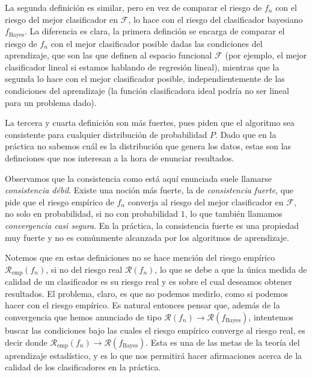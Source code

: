 \documentclass{article}
\begin{document}
La segunda definición es similar, pero en vez de comparar el riesgo de $f_n$ con el riesgo del mejor clasificador en $\mathcal{F}$,
lo hace con el riesgo del clasificador bayesiano $f_{\text{Bayes}}$. La diferencia es clara, la primera definción se encarga de 
comparar el riesgo de $f_n$ con el mejor clasificador posible dadas las condiciones del aprendizaje, que son las que definen al espacio funcional 
$\mathcal{F}$ (por ejemplo, el mejor clasificador lineal si estamos hablando de regresión lineal), mientras que la segunda lo hace con el
mejor clasificador posible, independientemente de las condiciones del aprendizaje (la función clasificadora ideal podría no ser lineal
para un problema dado).\newline

La tercera y cuarta definición son más fuertes, pues piden que el algoritmo sea consistente para cualquier distribución de probabilidad $P$.
Dado que en la práctica no sabemos cuál es la distribución que genera los datos, estas son las definciones que nos interesan a la hora de 
enunciar resultados.\newline

Observamos que la consistencia como está aquí enunciada suele llamarse \textit{consistencia débil}. Existe una noción más fuerte, la de
\textit{consistencia fuerte}, que pide que el riesgo empírico de $f_n$ converja al riesgo del mejor clasificador en $\mathcal{F}$, no solo
en probabilidad, si no con probabilidad $1$, lo que también llamamos \textit{convergencia casi segura}. En la práctica, la consistencia fuerte es una propiedad muy fuerte y no es comúnmente
alcanzada por los algoritmos de aprendizaje.\newline

Notemos que en estas definiciones no se hace mención del riesgo empírico $\mathcal{R}_{\text{emp}}(f_n)$, si no del riesgo real $\mathcal{R}(f_n)$, lo que
se debe a que la única medida de calidad de un clasificador es su riesgo real y es sobre el cual deseamos obtener resultados. El problema, claro,
es que no podemos medirlo, como si podemos hacer con el riesgo empírico. Es natural entonces pensar que, además de la convergencia que hemos anunciado
de tipo $\mathcal{R}(f_n) \rightarrow \mathcal{R}(f_{\text{Bayes}})$, intentemos buscar las condiciones bajo las cuales el riesgo empírico
converge al riesgo real, es decir donde  $\mathcal{R}_{\text{emp}}(f_n) \rightarrow \mathcal{R}(f_{\text{Bayes}})$. Esta es una de las metas
de la teoría del aprendizaje estadístico, y es lo que nos permitirá hacer afirmaciones acerca de la calidad de los clasificadores en la práctica.\newline
\end{document}

